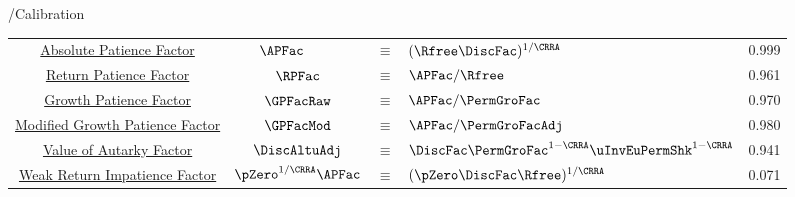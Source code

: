 \documentclass[\econtexRoot/BufferStockTheory]{subfiles}
\providecommand{\TblBox}{}\providecommand{\TblName}{}
\renewcommand{\TblName}{Calibration}
\begin{document}
\begin{verbatimwrite}{\TableDir/\TblName}
\begin{table}
{\begin{tabular}{|c|ccl|c|}
        \hyperlink{APFacDefn}{Absolute Patience Factor}                    & $\APFac_{\phantom{\Rfree}} $ & $\equiv$ & $ (\Rfree \DiscFac)^{1/\CRRA}$                & 0.999 \\
        \hyperlink{RPFacDefn}{Return Patience Factor}                      & $\RPFac$ & $\equiv$ & $\APFac/\Rfree $     & 0.961 \\
        \hyperlink{GPFacRawDefn}{\phantom{Modified }Growth Patience Factor}    & $\GPFacRaw$ & $\equiv$ & $\APFac/\PermGroFac $      & 0.970 \\
        \hyperlink{GPFacRawDefn}{Modified Growth Patience Factor}                      & $\GPFacMod$ & $\equiv$ & $ \APFac/\PermGroFacAdj$& 0.980 \\
        \hyperlink{VAFacDefn}{Value of Autarky Factor}         & $\DiscAltuAdj $ & $\equiv$ & $ \DiscFac \PermGroFac^{1-\CRRA}\uInvEuPermShk^{1-\CRRA}$       & 0.941 \\ 
        \hyperlink{WRIC}{Weak Return Impatience Factor}         & $\pZero^{1/\CRRA} \APFac $ & $\equiv$ & $ (\pZero \DiscFac \Rfree)^{1/\CRRA}$       & 0.071 \\ \hline
      \end{tabular}
    } %

    \settowidth\TableWidth{\usebox{\TblBox}}
    \savebox{\TblShrunkBox}{
      \settowidth{\TblShrunk}{\usebox{\TblBox}}
      \resizebox{0.9\textwidth}{!}{\begin{minipage}{\TblShrunk}
          \usebox{\TblBox}
        \end{minipage}}
    }

    \usebox{\TblShrunkBox}


  \end{table}
\end{verbatimwrite}
\clearpage

\end{document}
